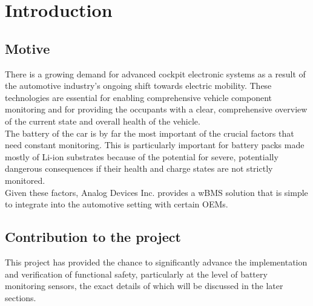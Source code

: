 \chapter{Introduction} %

\label{ch:intro}


\section{Motive}
There is a growing demand for advanced cockpit electronic systems as a result of the automotive industry's ongoing shift towards electric mobility. These technologies are essential for enabling comprehensive vehicle component monitoring and for providing the occupants with a clear, comprehensive overview of the current state and overall health of the vehicle. \\
The battery of the car is by far the most important of the crucial factors that need constant monitoring. This is particularly important for battery packs made mostly of Li-ion substrates because of the potential for severe, potentially dangerous consequences if their health and charge states are not strictly monitored. \\
Given these factors, Analog Devices Inc. provides a wBMS solution that is simple to integrate into the automotive setting with certain OEMs. 

\section{Contribution to the project}
This project has provided the chance to significantly advance the implementation and verification of functional safety, particularly at the level of battery monitoring sensors, the exact details of which will be discussed in the later sections. 